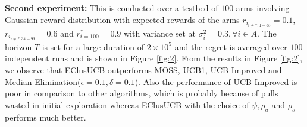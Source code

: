 \textbf{Second experiment:} This is conducted over a testbed of $100$ arms involving Gaussian reward distribution with expected rewards of the arms $r_{i_{{i}\neq {*}:1-33}}=0.1$, $r_{i_{{i}\neq {*}:34-99}}=0.6$ and $r^{*}_{i=100}=0.9$ with variance set at $\sigma_{i}^{2} = 0.3,\forall i\in A$. The horizon $T$ is set for a large duration of $2\times 10^{5}$ and the regret is averaged over $100$ independent runs and is shown in Figure \ref{fig:2}. From the results in Figure \ref{fig:2}, we observe that EClusUCB outperforms MOSS, UCB1, UCB-Improved and Median-Elimination($\epsilon=0.1,\delta=0.1$). Also the performance of UCB-Improved is poor in comparison to other algorithms, which is probably because of pulls wasted in initial exploration whereas EClusUCB with the choice of $\psi, \rho_{a}$ and $\rho_{s}$ performs much better.

